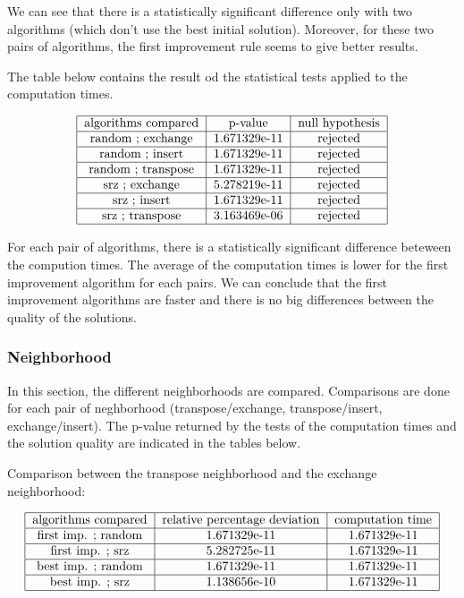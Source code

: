 \documentclass{article}
\begin{document}
We can see that there is a statistically significant difference only with two algorithms (which don't use the best initial solution).
Moreover, for these two pairs of algorithms, the first improvement rule seems to give better results. \newline

The table below contains the result od the statistical tests applied to the computation times.

\begin{align*}
\begin{tabular} {|c|c|c|} \hline
    algorithms compared & p-value & null hypothesis \\ \hline
    random ; exchange & 1.671329e-11 & rejected \\ \hline
    random ; insert & 1.671329e-11 & rejected \\ \hline
    random ; transpose & 1.671329e-11 & rejected \\ \hline
    srz ; exchange &5.278219e-11  & rejected \\ \hline
    srz ; insert & 1.671329e-11 & rejected \\ \hline
    srz ; transpose & 3.163469e-06 & rejected \\ \hline
\end{tabular}
\end{align*}

For each pair of algorithms, there is a statistically significant difference beteween the compution times.
The average of the computation times is lower for the first improvement algorithm for each pairs.
We can conclude that the first improvement algorithms are faster and there is no big differences between the quality of the solutions.

\subsubsection{Neighborhood}

In this section, the different neighborhoods are compared. Comparisons are done for each pair of neghborhood (transpose/exchange, transpose/insert, exchange/insert). The p-value returned by the tests of the computation times and the solution quality are indicated in the tables below. \newline

Comparison between the transpose neighborhood and the exchange neighborhood:

\begin{align*}
\begin{tabular} {|c|c|c|c|c|} \hline
    algorithms compared & relative percentage deviation & computation time \\ \hline
    first imp. ; random & 1.671329e-11 & 1.671329e-11 \\ \hline
    first imp. ; srz & 5.282725e-11 & 1.671329e-11 \\ \hline
    best imp. ; random & 1.671329e-11 & 1.671329e-11 \\ \hline
    best imp. ; srz & 1.138656e-10 & 1.671329e-11 \\ \hline
\end{tabular}
\end{align*}
\end{document}
